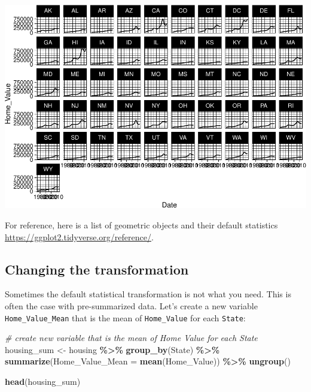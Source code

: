 \documentclass[
]{book}
\newenvironment{Shaded}{\begin{snugshade}}{\end{snugshade}}
\newcommand{\CommentTok}[1]{\textcolor[rgb]{0.56,0.35,0.01}{\textit{#1}}}
\newcommand{\DataTypeTok}[1]{\textcolor[rgb]{0.13,0.29,0.53}{#1}}
\newcommand{\KeywordTok}[1]{\textcolor[rgb]{0.13,0.29,0.53}{\textbf{#1}}}
\newcommand{\NormalTok}[1]{#1}
\newcommand{\OperatorTok}[1]{\textcolor[rgb]{0.81,0.36,0.00}{\textbf{#1}}}
\newcommand{\StringTok}[1]{\textcolor[rgb]{0.31,0.60,0.02}{#1}}
\begin{document}
\includegraphics{R/Rgraphics/figures/unnamed-chunk-179-1.pdf}

For reference, here is a list of geometric objects and their default statistics \url{https://ggplot2.tidyverse.org/reference/}.

\hypertarget{changing-the-transformation}{%
\subsection{Changing the transformation}\label{changing-the-transformation}}

Sometimes the default statistical transformation is not what you need. This is often the case with pre-summarized data. Let's create a new variable \texttt{Home\_Value\_Mean} that is the mean of \texttt{Home\_Value} for each \texttt{State}:

\begin{Shaded}
\begin{Highlighting}[]
\CommentTok{\# create new variable that is the mean of \textquotesingle{}Home Value\textquotesingle{} for each \textquotesingle{}State\textquotesingle{}}
\NormalTok{housing\_sum \textless{}{-}}\StringTok{ }
\StringTok{  }\NormalTok{housing }\OperatorTok{\%\textgreater{}\%}
\StringTok{  }\KeywordTok{group\_by}\NormalTok{(State) }\OperatorTok{\%\textgreater{}\%}
\StringTok{  }\KeywordTok{summarize}\NormalTok{(}\DataTypeTok{Home\_Value\_Mean =} \KeywordTok{mean}\NormalTok{(Home\_Value)) }\OperatorTok{\%\textgreater{}\%}
\StringTok{  }\KeywordTok{ungroup}\NormalTok{()}

\KeywordTok{head}\NormalTok{(housing\_sum)}
\end{Highlighting}
\end{Shaded}
\end{document}
